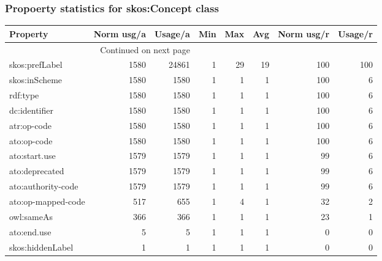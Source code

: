 \documentclass[10pt,a4paper,titlepage,final]{article}
\begin{document}
\subsubsection{Propoerty statistics for skos:Concept class}
\begin{longtable}{lrrrrrrr}
\toprule
           Property &  Norm usg/a &  Usage/a &  Min &  Max &  Avg &  Norm usg/r &  Usage/r \\
\midrule
\endhead
\midrule
\multicolumn{3}{r}{{Continued on next page}} \\
\midrule
\endfoot

\bottomrule
\endlastfoot
     skos:prefLabel &        1580 &    24861 &    1 &   29 &   19 &         100 &      100 \\
      skos:inScheme &        1580 &     1580 &    1 &    1 &    1 &         100 &        6 \\
           rdf:type &        1580 &     1580 &    1 &    1 &    1 &         100 &        6 \\
      dc:identifier &        1580 &     1580 &    1 &    1 &    1 &         100 &        6 \\
        atr:op-code &        1580 &     1580 &    1 &    1 &    1 &         100 &        6 \\
        ato:op-code &        1580 &     1580 &    1 &    1 &    1 &         100 &        6 \\
      ato:start.use &        1579 &     1579 &    1 &    1 &    1 &          99 &        6 \\
     ato:deprecated &        1579 &     1579 &    1 &    1 &    1 &          99 &        6 \\
 ato:authority-code &        1579 &     1579 &    1 &    1 &    1 &          99 &        6 \\
 ato:op-mapped-code &         517 &      655 &    1 &    4 &    1 &          32 &        2 \\
         owl:sameAs &         366 &      366 &    1 &    1 &    1 &          23 &        1 \\
        ato:end.use &           5 &        5 &    1 &    1 &    1 &           0 &        0 \\
   skos:hiddenLabel &           1 &        1 &    1 &    1 &    1 &           0 &        0 \\
\end{longtable}
\end{document}
